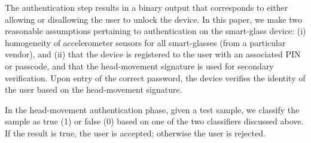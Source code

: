 The authentication step results in a binary output that corresponds to
either allowing or disallowing the user to unlock the device.
In this paper, we make two reasonable assumptions pertaining to authentication
on the smart-glass device: (i) homogeneity of
accelerometer sensors for all smart-glasses (from a particular vendor), and (ii)
that the device is registered to the user with an associated PIN or passcode,
and that the head-movement signature is used for secondary verification.
Upon entry of the correct password, the device verifies the identity
of the user based on the head-movement signature.

In the head-movement authentication phase, given a test sample, we classify the sample as true (1) or false
(0) based on one of the two classifiers discussed above. If the result is true, the user is accepted; otherwise
the user is rejected.
\fi




